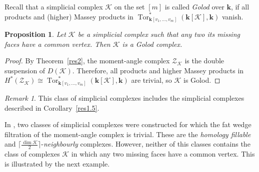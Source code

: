 \documentclass[a4paper,12pt]{amsart}
\newcommand{\K}{\mathcal K}
\newcommand{\kk}{\mathbf{k}}
\newcommand{\Z}{\mathcal Z}
\newtheorem{proposition}[formula]{Proposition}
\theoremstyle{definition}
\theoremstyle{remark}
\newtheorem*{remark}{Remark}
\numberwithin{equation}{section}
\DeclareMathOperator{\Tor}{Tor}
\begin{document}
Recall that a simplicial complex $\K$ on the set $[m]$ is called \textit{Golod} over $\kk$, if all products and (higher) Massey products in $\Tor^*_{\kk [v_1, \dots, v_m]} (\kk [\K], \kk)$ vanish.

\begin{proposition}\label{Gol}
	Let $\K$ be a simplicial complex such that any two its missing faces have a common vertex. Then
	$\K$ is a Golod complex.
\end{proposition}
\begin{proof}
By Theorem~\ref{res2}, the moment-angle complex $\mathcal Z_\K$ is the double suspension of $D(\K)$.
Therefore, all products and higher Massey products in $H^*(\Z_\K) \cong \Tor^*_{\kk [v_1, \dots, v_m]}(\kk [\K], \kk)$ are trivial, so $\K$ is Golod.
\end{proof}
\begin{remark}
	This class of simplicial complexes includes the simplicial complexes described in Corollary~\ref{res1.5}.
\end{remark}

In \cite{IK}, two classes of simplicial complexes were constructed for which the fat wedge filtration
of the moment-angle complex is trivial. These are the \emph{homology fillable} and $\lceil \frac{\dim \K}{2} \rceil$-\emph{neighbourly} complexes. However, neither of this classes contains the class of complexes $\K$ in which any two missing faces have a common vertex. This is illustrated by the next example.
\end{document}
